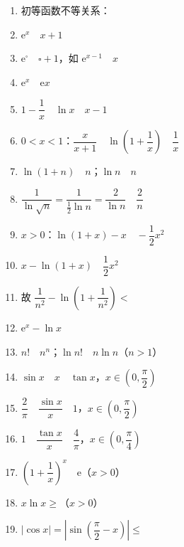\documentclass[a4paper,12pt]{article}
\begin{document}
    \begin{minipage}[t]{0.30\textwidth}
        \begin{enumerate}[leftmargin=*, itemsep=1.1em]
            \item 初等函数不等关系：
            \item $\mathrm{e}^x \quad x+1$
            \item $\mathrm{e}^{\square} \quad \square + 1$，如 $\mathrm{e}^{x-1} \quad x$
            \item $\mathrm{e}^x \quad \mathrm{e}x$
            \item $1-\dfrac{1}{x} \quad \ln x \quad x-1$
            \item $0<x<1$：$\dfrac{x}{x+1} \quad \ln\!\left(1+\dfrac{1}{x}\right) \quad \dfrac{1}{x}$
        \end{enumerate}
    \end{minipage}
    \hfill
    \begin{minipage}[t]{0.30\textwidth}
        \begin{enumerate}[leftmargin=*, itemsep=1.1em]
            \setcounter{enumi}{6}
            \item $\ln(1+n) \quad n$；$\ln n \quad n$
            \item $\dfrac{1}{\ln\sqrt{n}} = \dfrac{1}{\frac{1}{2}\ln n} = \dfrac{2}{\ln n} \quad \dfrac{2}{n}$
            \item $x>0$：$\ln(1+x) - x \quad -\dfrac{1}{2}x^2$
            \item $x - \ln(1+x) \quad \dfrac{1}{2}x^2$
            \item 故 $\dfrac{1}{n^2} - \ln\!\left(1+\dfrac{1}{n^2}\right) <$
            \item $\mathrm{e}^x - \ln x$
            \item $n! \quad n^n$；$\ln n! \quad n\ln n$（$n>1$）
        \end{enumerate}
    \end{minipage}
    \hfill
    \begin{minipage}[t]{0.30\textwidth}
        \begin{enumerate}[leftmargin=*, itemsep=1.1em]
            \setcounter{enumi}{13}
            \item $\sin x \quad x \quad \tan x$，$x\in\left(0,\dfrac{\pi}{2}\right)$
            \item $\dfrac{2}{\pi} \quad \dfrac{\sin x}{x} \quad 1$，$x\in\left(0,\dfrac{\pi}{2}\right)$
            \item $1 \quad \dfrac{\tan x}{x} \quad \dfrac{4}{\pi}$，$x\in\left(0,\dfrac{\pi}{4}\right)$
            \item $\left(1+\dfrac{1}{x}\right)^x \quad \mathrm{e}$（$x>0$）
            \item $x\ln x \ge$（$x>0$）
            \item $|\cos x| = \left|\sin\left(\dfrac{\pi}{2}-x\right)\right| \le$
        \end{enumerate}
    \end{minipage}
    \hfill
\end{document}
